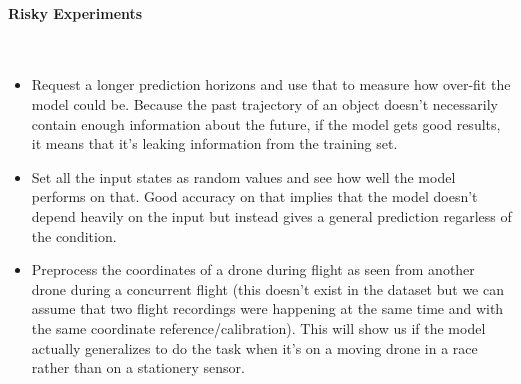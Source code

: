 \documentclass{article}
\begin{document}
\paragraph{Risky Experiments}$ $
\begin{itemize}
\item Request a longer prediction horizons and use that to measure how over-fit the model could be. Because the past trajectory of an object doesn't necessarily contain enough information about the future, if the model gets good results, it means that it's leaking information from the training set.
\item Set all the input states as random values and see how well the model performs on that. Good accuracy on that implies that the model doesn't depend heavily on the input but instead gives a general prediction regarless of the condition. 
\item Preprocess the coordinates of a drone during flight as seen from another drone during a concurrent flight (this doesn't exist in the dataset but we can assume that two flight recordings were happening at the same time and with the same coordinate reference/calibration). This will show us if the model actually generalizes to do the task when it's on a moving drone in a race rather than on a stationery sensor.
\end{itemize}





\end{document}
